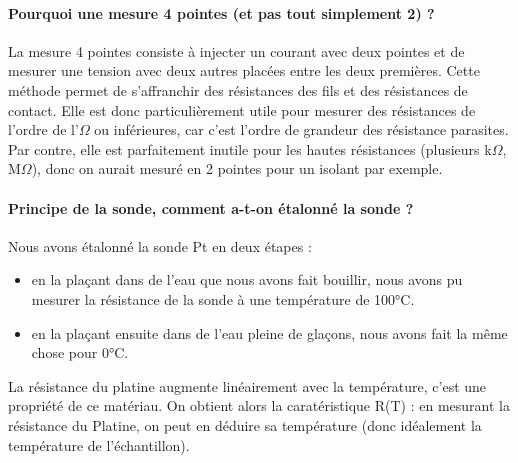 \paragraph*{Pourquoi une mesure 4 pointes (et pas tout simplement 2) ?}
La mesure 4 pointes consiste à injecter un courant avec deux pointes et de mesurer une tension avec deux autres placées entre les deux premières.
Cette méthode permet de s'affranchir des résistances des fils et des résistances de contact.
Elle est donc particulièrement utile pour mesurer des résistances de l'ordre de l'$\Omega$ ou inférieures, car c'est l'ordre de grandeur des résistance parasites.
Par contre, elle est parfaitement inutile pour les hautes résistances (plusieurs k$\Omega$, M$\Omega$), donc on aurait mesuré en 2 pointes pour un isolant par exemple.


\paragraph*{Principe de la sonde, comment a-t-on étalonné la sonde ?}
Nous avons étalonné la sonde Pt en deux étapes :


\begin{itemize}
  \item en la plaçant dans de l'eau que nous avons fait bouillir, nous avons pu mesurer la résistance de la sonde à une température de 100°C.
  \item en la plaçant ensuite dans de l'eau pleine de glaçons, nous avons fait la même chose pour 0°C.
\end{itemize}


La résistance du platine augmente linéairement avec la température, c'est une propriété de ce matériau.
On obtient alors la caratéristique R(T) : en mesurant la résistance du Platine, on peut en déduire sa température (donc idéalement la température de l'échantillon).


